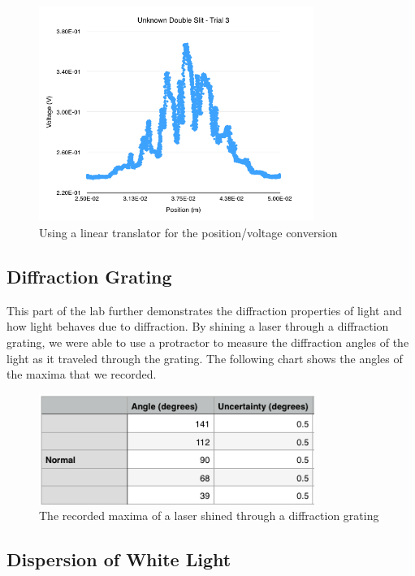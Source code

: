 \documentclass{article}
\begin{document}
\begin{figure}[H]
    \centering
    \includegraphics[width=0.8\textwidth]{charts/unknown3}
    \caption{Using a linear translator for the position/voltage conversion}
    \label{unknown3}
\end{figure}

\subsection{Diffraction Grating}

This part of the lab further demonstrates the diffraction properties of light
and how light behaves due to diffraction. By shining a laser through a
diffraction grating, we were able to use a protractor to measure the diffraction
angles of the light as it traveled through the grating. The following chart
shows the angles of the maxima that we recorded.

\begin{figure}[H]
    \centering
    \includegraphics[width=0.8\textwidth]{charts/diffraction-grating}
    \caption{The recorded maxima of a laser shined through a diffraction grating}
    \label{diffraction-grating}
\end{figure}

\subsection{Dispersion of White Light}
\end{document}

